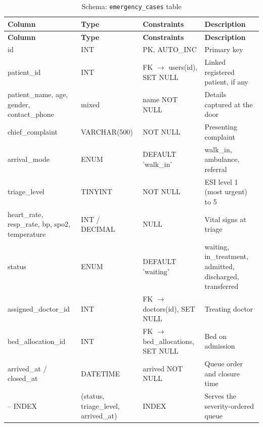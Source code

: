 \begin{longtable}{|L{3.3cm}|L{2.5cm}|L{2.4cm}|L{4.6cm}|}
\caption{Schema: \texttt{emergency\_cases} table} \label{tab:ercases} \\
\hline
\textbf{Column} & \textbf{Type} & \textbf{Constraints} & \textbf{Description} \\
\hline
\endfirsthead
\hline
\textbf{Column} & \textbf{Type} & \textbf{Constraints} & \textbf{Description} \\
\hline
\endhead
\hline
\endfoot
id & INT & PK, AUTO\_INC & Primary key \\
\hline
patient\_id & INT & FK $\rightarrow$ users(id), SET NULL & Linked registered patient, if any \\
\hline
patient\_name, age, gender, contact\_phone & mixed & name NOT NULL & Details captured at the door \\
\hline
chief\_complaint & VARCHAR(500) & NOT NULL & Presenting complaint \\
\hline
arrival\_mode & ENUM & DEFAULT 'walk\_in' & walk\_in, ambulance, referral \\
\hline
triage\_level & TINYINT & NOT NULL & ESI level 1 (most urgent) to 5 \\
\hline
heart\_rate, resp\_rate, bp, spo2, temperature & INT / DECIMAL & NULL & Vital signs at triage \\
\hline
status & ENUM & DEFAULT 'waiting' & waiting, in\_treatment, admitted, discharged, transferred \\
\hline
assigned\_doctor\_id & INT & FK $\rightarrow$ doctors(id), SET NULL & Treating doctor \\
\hline
bed\_allocation\_id & INT & FK $\rightarrow$ bed\_allocations, SET NULL & Bed on admission \\
\hline
arrived\_at / closed\_at & DATETIME & arrived NOT NULL & Queue order and closure time \\
\hline
-- INDEX & (status, triage\_level, arrived\_at) & INDEX & Serves the severity-ordered queue \\
\hline
\end{longtable}
